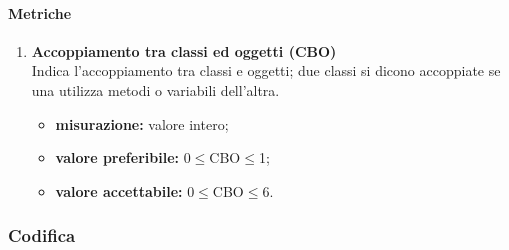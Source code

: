 		\paragraph{Metriche}
		\begin{enumerate}
		\item []
			\textbf{Accoppiamento tra classi ed oggetti (CBO)}\\
			Indica l'accoppiamento tra classi e oggetti; due classi si dicono accoppiate se una utilizza metodi o variabili dell'altra.
			\begin{itemize}
				\item \textbf{misurazione:} valore intero;
				\item \textbf{valore preferibile:} 0$\leq$CBO$\leq$1;
				\item \textbf{valore accettabile:} 0$\leq$CBO$\leq$6.
			\end{itemize}
		\end{enumerate}
	\subsubsection{Codifica}
